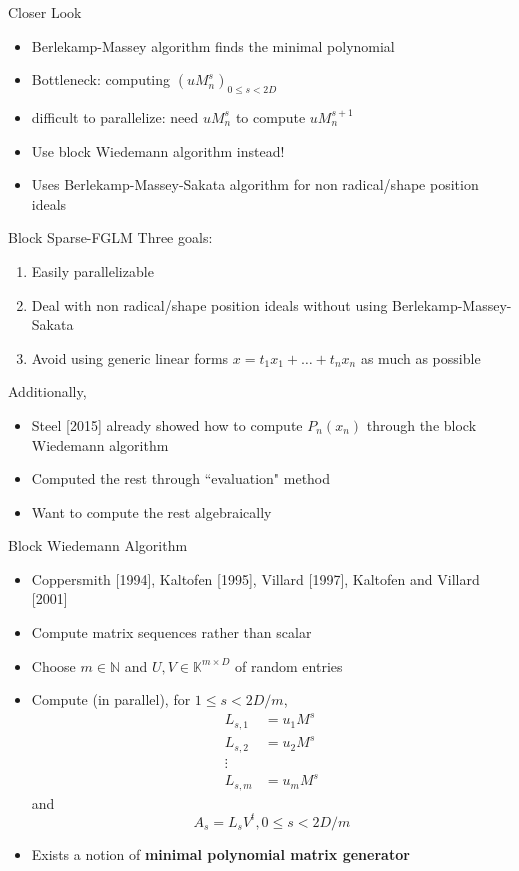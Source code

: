 \documentclass{beamer}
\begin{document}
\begin{frame}{Closer Look}
	\begin{itemize}
		\item Berlekamp-Massey algorithm finds the minimal polynomial
		\item Bottleneck: computing $(u M_n^s)_{0 \le s < 2D}$
		\item difficult to parallelize: need $uM_n^{s}$ to compute $uM_n^{s+1}$
		\item Use block Wiedemann algorithm instead!
		\item Uses Berlekamp-Massey-Sakata algorithm for non radical/shape position ideals
	\end{itemize}
\end{frame}

\begin{frame}{Block Sparse-FGLM}
	Three goals:
	\begin{enumerate}
		\item Easily parallelizable
		\item Deal with non radical/shape position ideals without using Berlekamp-Massey-Sakata
		\item Avoid using generic linear forms $x = t_1 x_1 + \dots + t_n x_n$ as much
		as possible
	\end{enumerate}
	\pause
	Additionally,
	\begin{itemize}
		\item Steel [2015] already showed how to compute $P_n(x_n)$ through the block Wiedemann algorithm
		\item Computed the rest through ``evaluation" method
		\item Want to compute the rest algebraically
	\end{itemize}
\end{frame}

\begin{frame}{Block Wiedemann Algorithm}
	\begin{itemize}
		\item Coppersmith [1994], Kaltofen [1995], Villard [1997], Kaltofen and Villard [2001]
		\item Compute matrix sequences
		rather than scalar
		\item Choose $m \in \mathbb{N}$ and
		$U,V \in \mathbb{K}^{m \times D}$ of random entries
		\item Compute (in parallel),
		for $1 \le s < 2D/m$,
		\begin{align*}
		L_{s,1} &= u_1 M^s\\
		L_{s,2} &= u_2 M^s\\
		\vdots\\
		L_{s,m} &= u_m M^s
		\end{align*}
		and
		$$ A_s = L_s V^t, 0\le s < 2D/m$$
		\item Exists a notion of \textbf{minimal polynomial matrix generator}
		
	\end{itemize}
	
\end{frame}
\end{document}

